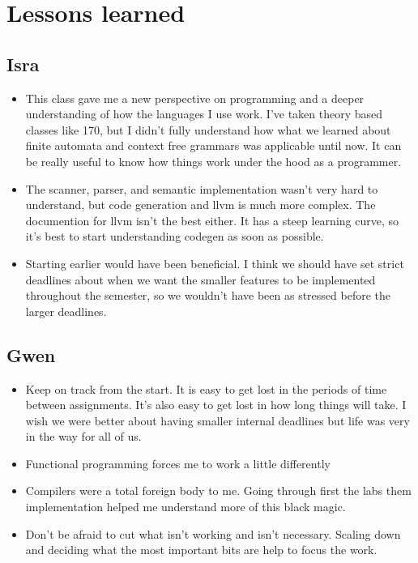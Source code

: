 \section{Lessons learned} 

\subsection{Isra}
\begin{itemize}
    \item This class gave me a new perspective on programming and a deeper understanding of how the languages I use work. I've taken theory based classes like 170, but I didn't fully understand how what we learned about finite automata and context free grammars was applicable until now. It can be really useful to know how things work under the hood as a programmer.
    \item The scanner, parser, and semantic implementation wasn't very hard to understand, but code generation and llvm is much more complex. The documention for llvm isn't the best either. It has a steep learning curve, so it's best to start understanding codegen as soon as possible.
    \item Starting earlier would have been beneficial. I think we should have set strict deadlines about when we want the smaller features to be implemented throughout the semester, so we wouldn't have been as stressed before the larger deadlines. 
\end{itemize}

\subsection{Gwen}
\begin{itemize}
    \item Keep on track from the start. It is easy to get lost in the periods of time between assignments. It's also easy to get lost in how long things will take. I wish we were better about having smaller internal deadlines but life was very in the way for all of us. 
    \item Functional programming forces me to work a little differently
    \item Compilers were a total foreign body to me. Going through first the labs them implementation helped me understand more of this black magic. 
    \item Don't be afraid to cut what isn't working and isn't necessary. Scaling down and deciding what the most important bits are help to focus the work.
\end{itemize}

